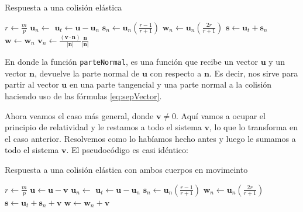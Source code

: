 {\centering
\begin{minipage}{\linewidth}
  \begin{algorithm}[H]
    \caption{Respuesta a una colisión elástica}
    \label{alg:elas}
    \begin{algorithmic}[1] %
\State $r \gets \frac{m}{p}$
\State $\textbf{u}_n \gets$ 
\State $\textbf{u}_t \gets \textbf{u} - \textbf{u}_n$
\State $\textbf{s}_n \gets \textbf{u}_n \left( \frac{r - 1}{r + 1} \right) $
\State $\textbf{w}_n \gets \textbf{u}_n \left( \frac{2r}{r + 1} \right) $
\State $\textbf{s} \gets \textbf{u}_t + \textbf{s}_n$
\State $\textbf{w} \gets \textbf{w}_n$
\State {}
\EndProcedure
{}
\State $\textbf{v}_n \gets \frac{(\textbf{v} \cdot \textbf{n})}{|\textbf{n}|} \frac{\textbf{n}}{|\textbf{n}|}$
\State {}
\EndProcedure
    \end{algorithmic}
  \end{algorithm}
\end{minipage}
\par
}

En donde la función \verb|parteNormal|, es una función que recibe un vector $\textbf{u}$ y un vector $\textbf{n}$, devuelve la parte normal de $\textbf{u}$ con respecto a $\textbf{n}$.
Es decir, nos sirve para partir al vector $\textbf{u}$ en una parte tangencial y una parte normal a la colisión haciendo uso de las fórmulas \eqref{eq:sepVector}.

Ahora veamos el caso más general, donde $\textbf{v} \neq 0$. Aquí vamos a ocupar el principio de relatividad y le restamos a todo el sistema $\textbf{v}$, lo que lo transforma en el caso anterior. Resolvemos como lo habíamos hecho antes y luego le sumamos a todo el sistema $\textbf{v}$. El pseudocódigo es casi idéntico:
 
{\centering
\begin{minipage}{\linewidth}
  \begin{algorithm}[H]
    \caption{Respuesta a una colisión elástica con ambos cuerpos en movimeinto}
    \label{alg:elasmov}
    \begin{algorithmic}[1] %
\State $r \gets \frac{m}{p}$
\State $\textbf{u} \gets \textbf{u} - \textbf{v}$
\State $\textbf{u}_n \gets$ 
\State $\textbf{u}_t \gets \textbf{u} - \textbf{u}_n$
\State $\textbf{s}_n \gets \textbf{u}_n \left( \frac{r - 1}{r + 1} \right) $
\State $\textbf{w}_n \gets \textbf{u}_n \left( \frac{2r}{r + 1} \right) $
\State $\textbf{s} \gets \textbf{u}_t + \textbf{s}_n + \textbf{v}$
\State $\textbf{w} \gets \textbf{w}_n + \textbf{v}$
\State {}
\EndProcedure
    \end{algorithmic}
  \end{algorithm}
\end{minipage}
\par
}

